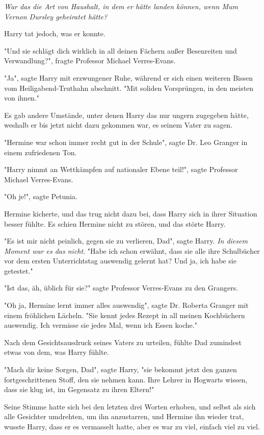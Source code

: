 {\emph{War das die Art von Haushalt, in dem er hätte landen können, wenn Mum Vernon Dursley geheiratet hätte?}

Harry tat jedoch, was er konnte.

"Und sie schlägt dich wirklich in all deinen Fächern außer Besenreiten und Verwandlung?", fragte Professor Michael Verres-Evans.

"Ja", sagte Harry mit erzwungener Ruhe, während er sich einen weiteren Bissen vom Heiligabend-Truthahn abschnitt. "Mit soliden Vorsprüngen, in den meisten von ihnen."

Es gab andere Umstände, unter denen Harry das nur ungern zugegeben hätte, weshalb er bis jetzt nicht dazu gekommen war, es seinem Vater zu sagen.

"Hermine war schon immer recht gut in der Schule", sagte Dr. Leo Granger in einem zufriedenen Ton.

"Harry nimmt an Wettkämpfen auf nationaler Ebene teil!", sagte Professor Michael Verres-Evans.

"Oh je!", sagte Petunia.

Hermine kicherte, und das trug nicht dazu bei, dass Harry sich in ihrer Situation besser fühlte. Es schien Hermine nicht zu stören, und das störte Harry.

"Es ist mir nicht peinlich, gegen sie zu verlieren, Dad", sagte Harry. \emph{In diesem Moment war es das nicht}. "Habe ich schon erwähnt, dass sie alle ihre Schulbücher vor dem ersten Unterrichtstag auswendig gelernt hat? Und ja, ich habe sie getestet."

"Ist das, äh, üblich für sie?" sagte Professor Verres-Evans zu den Grangers.

"Oh ja, Hermine lernt immer alles auswendig", sagte Dr. Roberta Granger mit einem fröhlichen Lächeln. "Sie kennt jedes Rezept in all meinen Kochbüchern auswendig. Ich vermisse sie jedes Mal, wenn ich Essen koche."

Nach dem Gesichtsausdruck seines Vaters zu urteilen, fühlte Dad zumindest etwas von dem, was Harry fühlte.

"Mach dir keine Sorgen, Dad", sagte Harry, "sie bekommt jetzt den ganzen fortgeschrittenen Stoff, den sie nehmen kann. Ihre Lehrer in Hogwarts wissen, dass sie klug ist, im Gegensatz zu ihren Eltern!"

Seine Stimme hatte sich bei den letzten drei Worten erhoben, und selbst als sich alle Gesichter umdrehten, um ihn anzustarren, und Hermine ihn wieder trat, wusste Harry, dass er es vermasselt hatte, aber es war zu viel, einfach viel zu viel.

}
